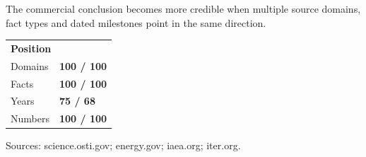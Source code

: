 \documentclass[10pt,a4paper]{article}
\begin{document}
\vspace{1pt}\noindent\begin{minipage}[t]{0.56\linewidth}
{\footnotesize\color{BOText} The commercial conclusion becomes more credible when multiple source domains, fact types and dated milestones point in the same direction.}\par
\end{minipage}\hfill\begin{minipage}[t]{0.36\linewidth}
{\scriptsize\color{BOText}\begin{tabular}{p{31mm}>{\raggedleft\arraybackslash}p{18mm}}
\multicolumn{2}{l}{\textcolor{BOGreen}{\bfseries Position}}\\[2pt]
Domains & \textbf{100 / 100}\\[1pt]
Facts & \textbf{100 / 100}\\[1pt]
Years & \textbf{75 / 68}\\[1pt]
Numbers & \textbf{100 / 100}\\[1pt]
\end{tabular}}\par
\end{minipage}\par\vspace{1pt}
\par
{\scriptsize\color{BOMuted} Sources: science.osti.gov; energy.gov; iaea.org; iter.org.}\par
\end{document}
